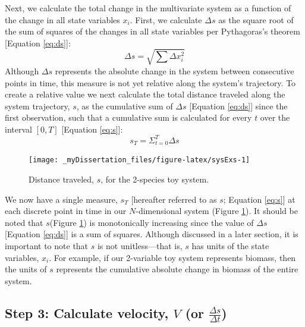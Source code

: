 \documentclass[12pt,twoside,openany]{reedthesis}
\begin{document}
Next, we calculate the total change in the multivariate system as a function of the change in all state variables \(x_i\). First, we calculate \(\Delta s\) as the square root of the sum of squares of the changes in all state variables per Pythagoras's theorem {[}Equation \eqref{eq:ds}{]}:
\begin{equation}
\Delta s = \sqrt{\sum{\Delta x_i^2}}
\label{eq:ds}
\end{equation}
Although \(\Delta s\) represents the absolute change in the system between consecutive points in time, this measure is not yet relative along the system's trajectory. To create a relative value we next calculate the total distance traveled along the system trajectory, \(s\), as the cumulative sum of \(\Delta s\) {[}Equation \eqref{eq:ds}{]} since the first observation, such that a cumulative sum is calculated for every \(t\) over the interval \([0,T]\) {[}Equation \eqref{eq:s}{]}:
\begin{equation}
s_T = \Sigma_{t=0}^{T}{\Delta s}
  \label{eq:s}
\end{equation}
\begin{figure}
\texttt{[image: \_myDissertation\_files/figure-latex/sysExs-1]} \caption{Distance traveled, $s$, for the 2-species toy system.}\label{fig:sysExs}
\end{figure}
We now have a single measure, \(s_T\) {[}hereafter referred to as \(s\); Equation \eqref{eq:s}{]} at each discrete point in time in our \(N\)-dimensional system (Figure \ref{fig:sysExs}). It should be noted that \(s\)(Figure \ref{fig:sysExs}) is monotonically increasing since the value of \(\Delta s\) {[}Equation \eqref{eq:ds}{]} is a sum of squares. Although discussed in a later section, it is important to note that \(s\) is not unitless---that is, \(s\) has units of the state variables, \(x_i\). For example, if our 2-variable toy system represents biomass, then the units of \(s\) represents the cumulative absolute change in biomass of the entire system.

\hypertarget{step-3-calculate-velocity-v-or-fracdelta-sdelta-t}{%
\subsection{\texorpdfstring{Step 3: Calculate velocity, \(V\) (or \(\frac{\Delta s}{\Delta t}\))}{Step 3: Calculate velocity, V (or \textbackslash frac\{\textbackslash Delta s\}\{\textbackslash Delta t\})}}\label{step-3-calculate-velocity-v-or-fracdelta-sdelta-t}}
\end{document}

